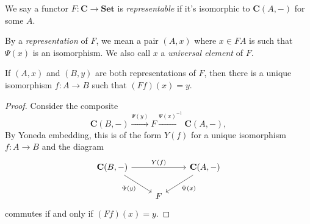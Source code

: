 \documentclass[a4paper]{article}
\renewcommand{\c}[1]{\mathbf{#1}}
\newcommand{\Set}{{\c{Set}}}
\begin{document}
\begin{definition}
  We say a functor \(F: \c C \to \Set\) is \emph{representable} if it's isomorphic to \(\c C(A, -)\) for some \(A\).

  By a \emph{representation} of \(F\), we mean a pair \((A, x)\) where \(x \in FA\) is such that \(\Psi(x)\) is an isomorphism. We also call \(x\) a \emph{universal element} of \(F\).
\end{definition}

\begin{corollary}
  If \((A, x)\) and \((B, y)\) are both representations of \(F\), then there is a unique isomorphism \(f: A \to B\) such that \((Ff)(x) = y\).
\end{corollary}

\begin{proof}
  Consider the composite
  \[
    \c C(B, -) \xrightarrow{\Psi(y)} F \xrightarrow{\Psi(x)^{-1}} \c C(A, -),
  \]
  By Yoneda embedding, this is of the form \(Y(f)\) for a unique isomorphism \(f: A \to B\) and the diagram
  \[
    \begin{tikzcd}
      \c C(B, -) \ar[rr, "Y(f)"] \ar[dr, "\Psi(y)"'] & & \c C(A, -) \ar[dl, "\Psi(x)"] \\
      & F
    \end{tikzcd}
  \]
  commutes if and only if \((Ff) (x) = y\).
\end{proof}
\end{document}
